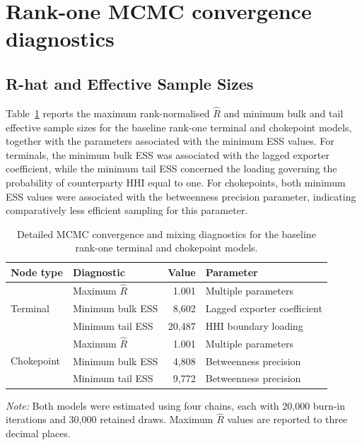 \documentclass[pdftex,12pt,openright,a4paper,oneside]{book}
\begin{document}
\section{Rank-one MCMC convergence diagnostics}
\label{app:mcmc_diagnostics}

\subsection{R-hat and Effective Sample Sizes}

Table~\ref{tab:baseline_detailed_mixing}
reports the maximum rank-normalised $\widehat{R}$
and minimum bulk and tail effective sample sizes
for the baseline rank-one terminal and chokepoint models,
together with the parameters associated with
the minimum ESS values.
For terminals, the minimum bulk ESS was associated
with the lagged exporter coefficient, while the
minimum tail ESS concerned the loading governing
the probability of counterparty HHI equal to one.
For chokepoints, both minimum ESS values were
associated with the betweenness precision parameter,
indicating comparatively less efficient sampling
for this parameter.

\begin{table}[htbp]
\centering
\small

\caption{Detailed MCMC convergence and mixing
diagnostics for the baseline rank-one terminal
and chokepoint models.}

\label{tab:baseline_detailed_mixing}

\begin{tabular}{llrl}
\toprule
Node type & Diagnostic & Value & Parameter \\
\midrule

\multirow{3}{*}{Terminal}
& Maximum $\widehat{R}$
& 1.001
& Multiple parameters \\

& Minimum bulk ESS
& 8,602
& Lagged exporter coefficient \\

& Minimum tail ESS
& 20,487
& HHI boundary loading \\

\midrule

\multirow{3}{*}{Chokepoint}
& Maximum $\widehat{R}$
& 1.001
& Multiple parameters \\

& Minimum bulk ESS
& 4,808
& Betweenness precision \\

& Minimum tail ESS
& 9,772
& Betweenness precision \\

\bottomrule
\end{tabular}

\begin{minipage}{0.95\textwidth}
\vspace{0.2cm}
\footnotesize
\textit{Note:} Both models were estimated using
four chains, each with 20,000 burn-in iterations
and 30,000 retained draws. Maximum $\widehat{R}$
values are reported to three decimal places.
\end{minipage}

\end{table}
\end{document}
